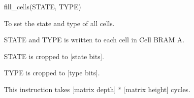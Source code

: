 

\format

fill\_cells(STATE, TYPE)

\purpose

To set the state and type of all cells.

\description

STATE and TYPE is written to each cell in Cell BRAM A.

\notes

STATE is cropped to [state bits].

TYPE is cropped to [type bits].

This instruction takes [matrix depth] * [matrix height] cycles.
